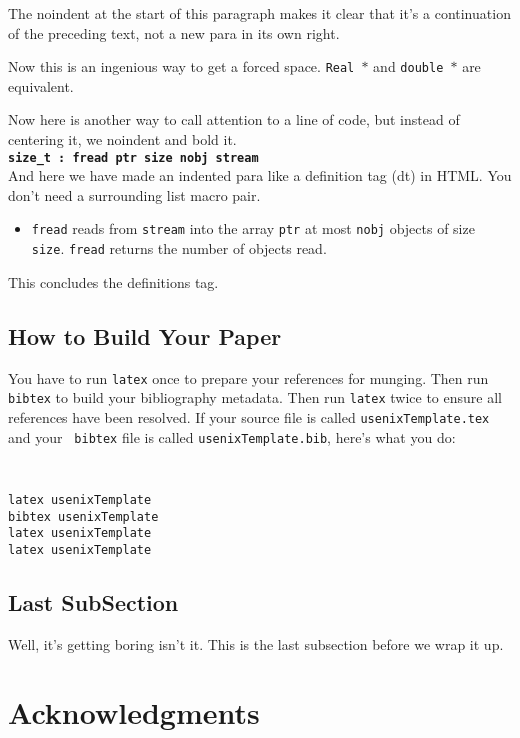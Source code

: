 \documentclass[letterpaper,twocolumn,10pt]{article}
\begin{document}
\noindent
The noindent at the start of this paragraph makes it clear that it's
a continuation of the preceding text, not a new para in its own right.


Now this is an ingenious way to get a forced space.
{\tt Real~$*$} and {\tt double~$*$} are equivalent. 

Now here is another way to call attention to a line of code, but instead
of centering it, we noindent and bold it.\\

\noindent
{\bf \tt size\_t : fread ptr size nobj stream } \\

And here we have made an indented para like a definition tag (dt)
in HTML.  You don't need a surrounding list macro pair.
\begin{itemize}
\item[]  {\tt fread} reads from {\tt stream} into the array {\tt ptr} at
most {\tt nobj} objects of size {\tt size}.   {\tt fread} returns
the number of objects read. 
\end{itemize}
This concludes the definitions tag.

\subsection{How to Build Your Paper}

You have to run {\tt latex} once to prepare your references for
munging.  Then run {\tt bibtex} to build your bibliography metadata.
Then run {\tt latex} twice to ensure all references have been resolved.
If your source file is called {\tt usenixTemplate.tex} and your {\tt
  bibtex} file is called {\tt usenixTemplate.bib}, here's what you do:
{\tt \small
\begin{verbatim}
latex usenixTemplate
bibtex usenixTemplate
latex usenixTemplate
latex usenixTemplate
\end{verbatim}
}


\subsection{Last SubSection}

Well, it's getting boring isn't it.  This is the last subsection
before we wrap it up.

\section{Acknowledgments}
\end{document}
